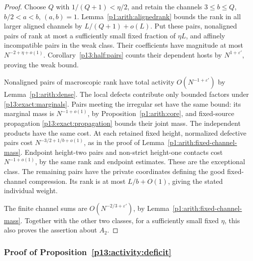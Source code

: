 \begin{proof}
Choose \(Q\) with \(1/(Q+1)<\eta/2\), and retain the
channels \(3\le b\le Q\), \(b/2<a<b\), \((a,b)=1\).
Lemma~\ref{p1:arith:alignedrank} bounds the rank in all
larger aligned channels by \(L/(Q+1)+o(L)\).
Put these pairs, nonaligned pairs of rank at most a
sufficiently small fixed fraction of \(\eta L\), and
affinely incompatible pairs in the weak class.
Their coefficients have magnitude at most
\(N^{-2+\eta+o(1)}\).
Corollary~\ref{p13:half:pairs} counts their dependent hosts
by \(N^{1+\varepsilon'}\), proving the weak bound.

Nonaligned pairs of macroscopic rank have total activity
\(O(N^{-1+\varepsilon'})\) by Lemma~\ref{p1:arith:dense}.
The local defects contribute only bounded factors under
\eqref{p13:exact:marginals}.
Pairs meeting the irregular set have the same bound:
its marginal mass is \(N^{-1+o(1)}\), by
Proposition~\ref{p1:arith:core}, and fixed-source
propagation \eqref{p13:exact:propagation} bounds their
joint mass. The independent products have the same cost.
At each retained fixed height, normalized defective pairs
cost \(N^{-3/2+1/b+o(1)}\), as in the proof of
Lemma~\ref{p1:arith:fixed-channel-mass}.
Endpoint height-two pairs and non-strict height-one contacts
cost \(N^{-1+o(1)}\), by the same rank and endpoint estimates.
These are the exceptional class.
The remaining pairs have the private coordinates defining
the good fixed-channel compression. Its rank is at most
\(L/b+O(1)\), giving the stated individual weight.

The finite channel sums are \(O(N^{-2/3+\varepsilon'})\),
by Lemma~\ref{p1:arith:fixed-channel-mass}. Together with
the other two classes, for a sufficiently small fixed
\(\eta\), this also proves the assertion about \(A_2\).
\end{proof}

\subsubsection{Proof of Proposition~\ref{p13:activity:deficit}}
\label{p14:comp:activity:deficit}

